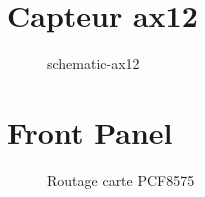 
\chapter{Capteur ax12}
\label{sec:schematic-ax12}

\begin{figure}[htpb]
  \centering
  \caption{schematic-ax12}
  \label{fig:schematic-ax12}
\end{figure}

\chapter{Front Panel}
\label{sec:FrontPanel}

\begin{figure}[htpb]
  \centering
  \caption{Routage carte PCF8575}
  \label{fig:FrontPanel}
\end{figure}
